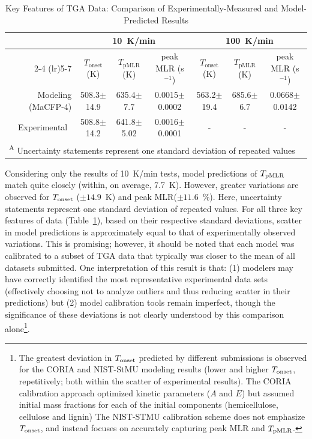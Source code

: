 \documentclass{article}
\begin{document}
\begin{table}[htbp] 
	\centering 
	\caption{Key Features of TGA Data: Comparison of Experimentally-Measured and Model-Predicted Results} 
	\label{tab:TGA_stats} 
	\begin{tabular}{rcccccc} 
		\toprule & \multicolumn{3}{c}{10~K/min} & \multicolumn{3}{c}{100~K/min} \\ \cmidrule(lr){2-4} \cmidrule(lr){5-7} & $T_{\mathrm{onset}}$ (K) & $T_{\mathrm{pMLR}}$ (K) & peak MLR (s$^{-1}$) & $T_{\mathrm{onset}}$ (K) & $T_{\mathrm{pMLR}}$ (K) & peak MLR (s$^{-1}$)\\ 
		\midrule 
		Modeling (MaCFP-4)  & 508.3$\pm$14.9& 635.4$\pm$7.7&0.0015$\pm$0.0002& 563.2$\pm$19.4& 685.6$\pm$6.7&0.0668$\pm$0.0142\\ 
		Experimental~\cite{MaCFP4PyrolysisExp} & 508.8$\pm$14.2 & 641.8$\pm$5.02 & 0.0016$\pm$0.0001 & -&-&- \\ \bottomrule 
		\multicolumn{7}{l}{\textsuperscript{A} Uncertainty statements represent one standard deviation of repeated values}
	\end{tabular} 
\end{table}

Considering only the results of 10~K/min tests, model predictions of $T_{\rm{pMLR}}$ match quite closely (within, on average, 7.7~K). However, greater variations are observed for  $T_{\rm{onset}}$ ($\pm 14.9$~K) and peak MLR($\pm11.6$~\%). Here, uncertainty statements represent one standard deviation of repeated values. For all three key features of data (Table~\ref{tab:TGA_stats}), based on their respective standard deviations, scatter in model predictions is approximately equal to that of experimentally observed variations. This is promising; however, it should be noted that each model was calibrated to a subset of TGA data that typically was closer to the mean of all datasets submitted. One interpretation of this result is that: (1) modelers may have correctly identified the most representative experimental data sets (effectively choosing not to analyze outliers and thus reducing scatter in their predictions) but (2) model calibration tools remain imperfect, though the significance of these deviations is not clearly understood by this comparison alone\footnote{The greatest deviation in $T_{\rm{onset}}$ predicted by different submissions is observed for the CORIA and NIST-StMU modeling results (lower and higher $T_{\rm{onset}}$, repetitively; both within the scatter of experimental results). The CORIA calibration approach optimized kinetic parameters ($A$ and $E$) but assumed initial mass fractions for each of the initial components (hemicellulose, cellulose and lignin) The NIST-STMU calibration scheme does not emphasize $T_{\rm{onset}}$, and instead focuses on accurately capturing peak MLR and $T_{\rm{pMLR}}$.}. 
\end{document}
